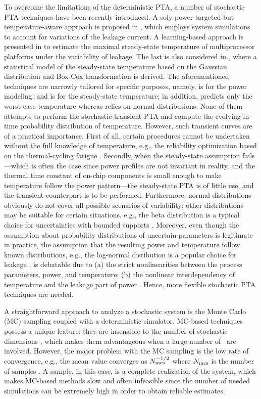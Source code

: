 To overcome the limitations of the deterministic PTA, a number of stochastic PTA techniques have been recently introduced. A soly power-targeted but temperature-aware approach is proposed in \cite{chandra2010}, which employs system simulations to account for variations of the leakage current. A learning-based approach is presented in \cite{juan2011} to estimate the maximal steady-state temperature of multiprocessor platforms under the variability of leakage. The last is also considered in \cite{juan2012}, where a statistical model of the steady-state temperature based on the Gaussian distribution and Box-Cox transformation is derived. The aforementioned techniques are narrowly tailored for specific purposes, namely, \cite{chandra2010} is for the power modeling; \cite{juan2011} and \cite{juan2012} is for the steady-state temperature; in addition, \cite{juan2011} predicts only the worst-case temperature whereas \cite{juan2012} relies on normal distributions. None of them attempts to perform the stochastic transient PTA and compute the evolving-in-time probability distribution of temperature. However, such transient curves are of a practical importance. First of all, certain procedures cannot be undertaken without the full knowledge of temperature, e.g., the reliability optimization based on the thermal-cycling fatigue \cite{ukhov2012}. Secondly, when the steady-state assumption fails---which is often the case since power profiles are not invariant in reality, and the thermal time constant of on-chip components is small enough to make temperature follow the power pattern---the steady-state PTA is of little use, and the transient counterpart is to be performed. Furthermore, normal distributions obviously do not cover all possible scenarios of variability; other distributions may be suitable for certain situations, e.g., the beta distribution is a typical choice for uncertainties with bounded supports \cite{maitre2010}. Moreover, even though the assumption about probability distributions of uncertain parameters is legitimate in practice, the assumption that the resulting power and temperature follow known distributions, e.g., the log-normal distibution is a popular choice for leakage \cite{srivastava2010}, is debatable due to (a) the strict nonlinearities between the process parameters, power, and temperature; (b) the nonlinear interdependency of temperature and the leakage part of power \cite{liu2007}. Hence, more flexible stochastic PTA techniques are needed.

A straightforward approach to analyze a stochastic system is the Monte Carlo (MC) sampling coupled with a deterministic simulator. MC-based techniques possess a unique feature: they are insensible to the number of stochastic dimensions \cite{maitre2010}, which makes them advantageous when a large number of \rvs\ are involved. However, the major problem with the MC sampling is the low rate of convergence, e.g., the mean value converges as $N_\text{mcs}^{-{{1}/{2}}}$ where $N_\text{mcs}$ is the number of samples \cite{xiu2010, maitre2010}. A sample, in this case, is a complete realization of the system, which makes MC-based methods slow and often infeasible since the number of needed simulations can be extremely high in order to obtain reliable estimates.

